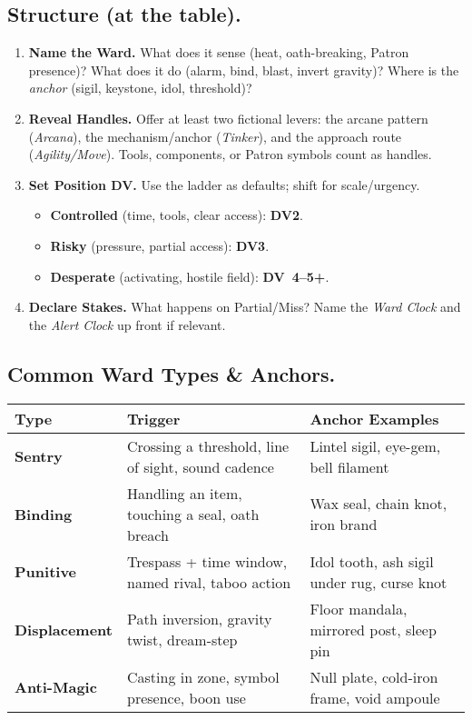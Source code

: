 \subsection{Structure (at the table).}
\begin{enumerate}[label=\textbf{Step~\arabic*:}, leftmargin=2.1em]
\item \textbf{Name the Ward.} What does it sense (heat, oath-breaking, Patron presence)? What does it do (alarm, bind, blast, invert gravity)? Where is the \emph{anchor} (sigil, keystone, idol, threshold)?
\item \textbf{Reveal Handles.} Offer at least two fictional levers: the arcane pattern (\emph{Arcana}), the mechanism/anchor (\emph{Tinker}), and the approach route (\emph{Agility/Move}). Tools, components, or Patron symbols count as handles.
\item \textbf{Set Position \textrightarrow{} DV.} Use the ladder as defaults; shift for scale/urgency.
\begin{itemize}
\item \textbf{Controlled} (time, tools, clear access): \textbf{DV2}.
\item \textbf{Risky} (pressure, partial access): \textbf{DV3}.
\item \textbf{Desperate} (activating, hostile field): \textbf{DV~4–5+}.
\end{itemize}
\item \textbf{Declare Stakes.} What happens on Partial/Miss? Name the \emph{Ward Clock} and the \emph{Alert Clock} up front if relevant.
\end{enumerate}

\subsection{Common Ward Types & Anchors.}
\begin{tabularx}{\linewidth}{>{\bfseries}l >{\raggedright\arraybackslash}X >{\raggedright\arraybackslash}X}
\toprule
Type & Trigger & Anchor Examples \\
\midrule
Sentry & Crossing a threshold, line of sight, sound cadence & Lintel sigil, eye-gem, bell filament \\
Binding & Handling an item, touching a seal, oath breach & Wax seal, chain knot, iron brand \\
Punitive & Trespass + time window, named rival, taboo action & Idol tooth, ash sigil under rug, curse knot \\
Displacement & Path inversion, gravity twist, dream-step & Floor mandala, mirrored post, sleep pin \\
Anti-Magic & Casting in zone, symbol presence, boon use & Null plate, cold-iron frame, void ampoule \\
\bottomrule
\end{tabularx}

